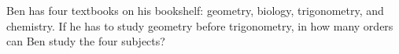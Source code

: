 Ben has four textbooks on his bookshelf: geometry, biology, trigonometry, and chemistry. If he has to study geometry before trigonometry, in how many orders can Ben study the four subjects?
